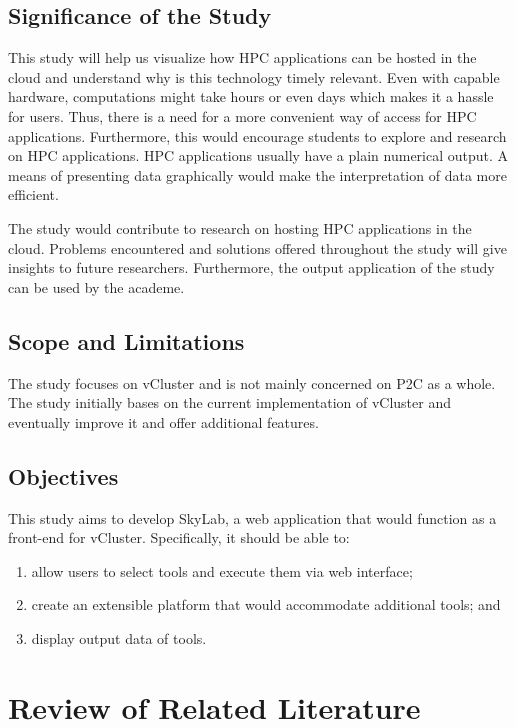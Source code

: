 \documentclass[journal]{./IEEE/IEEEtran}
\begin{document}
    \subsection{Significance of the Study}
    This study will help us visualize how HPC applications can be hosted in the cloud and understand why is this technology timely relevant.  Even with capable hardware, computations might take hours or even days which makes it a hassle for users. Thus, there is a need for a more convenient way of access for HPC applications. Furthermore, this would encourage students to explore and research on HPC applications. HPC applications usually have a plain numerical output. A means of presenting data graphically would make the interpretation of data more efficient.

    The study would contribute to research on hosting HPC applications in the cloud. Problems encountered and solutions offered throughout the study will give insights to future researchers. Furthermore, the output application of the study can be used by the academe.

    \subsection{Scope and Limitations}
    The study focuses on vCluster and is not mainly concerned on P2C as a whole. The study initially bases on the current implementation of vCluster and eventually improve it and offer additional features\cite {Hermocilla2014}.

    \subsection{Objectives}
    This study aims to develop SkyLab, a web application that would function as a front-end for vCluster. %
	Specifically, it should be able to: 
	\begin{enumerate}
	
		\item allow users to select tools and execute them via web interface; 
        \item create an extensible platform that would accommodate additional tools; and
		\item display output data of tools.
	\end{enumerate}

\section {Review of Related Literature}
\end{document}
